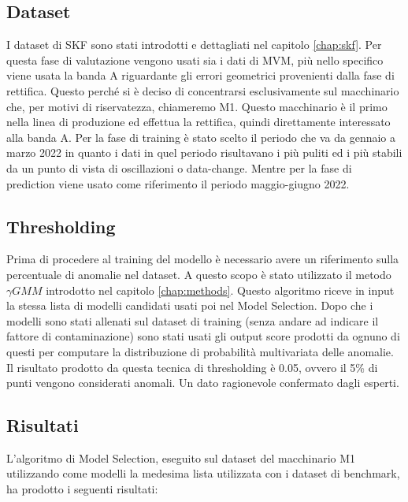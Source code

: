 \subsection{Dataset}
I dataset di SKF sono stati introdotti e dettagliati nel capitolo \ref{chap:skf}. Per questa fase di valutazione vengono usati sia i dati di MVM, più nello specifico viene usata la banda A riguardante gli errori geometrici provenienti dalla fase di rettifica. Questo perché si è deciso di concentrarsi esclusivamente sul macchinario che, per motivi di riservatezza, chiameremo M1. Questo macchinario è il primo nella linea di produzione ed effettua la rettifica, quindi direttamente interessato alla banda A.
Per la fase di training è stato scelto il periodo che va da gennaio a marzo 2022 in quanto i dati in quel periodo risultavano i più puliti ed i più stabili da un punto di vista di oscillazioni o data-change. Mentre per la fase di prediction viene usato come riferimento il periodo maggio-giugno 2022.



\subsection{Thresholding}
Prima di procedere al training del modello è necessario avere un riferimento sulla percentuale di anomalie nel dataset. A questo scopo è stato utilizzato il metodo ${\gamma}GMM$ introdotto nel capitolo \ref{chap:methods}.
Questo algoritmo riceve in input la stessa lista di modelli candidati usati poi nel Model Selection. Dopo che i modelli sono stati allenati sul dataset di training (senza andare ad indicare il fattore di contaminazione) sono stati usati gli output score prodotti da ognuno di questi per computare la distribuzione di probabilità multivariata delle anomalie.
Il risultato prodotto da questa tecnica di thresholding è 0.05, ovvero il 5\% di punti vengono considerati anomali. Un dato ragionevole confermato dagli esperti.


\subsection{Risultati}
L'algoritmo di Model Selection, eseguito sul dataset del macchinario M1 utilizzando come modelli la medesima lista utilizzata con i dataset di benchmark, ha prodotto i seguenti risultati:


